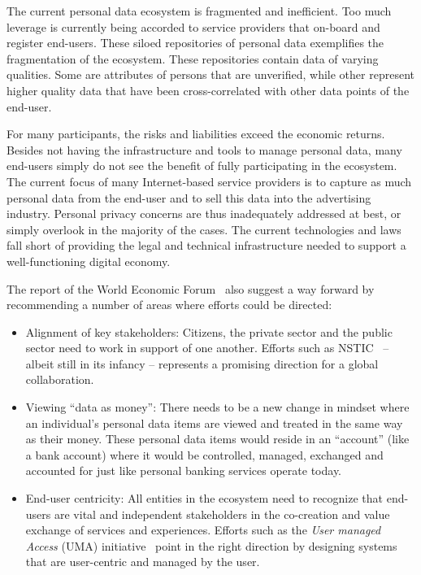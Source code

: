 The current personal data ecosystem is fragmented and inefficient.
Too much leverage is currently being accorded to service providers that on-board
and register end-users.
These siloed repositories of personal data exemplifies the fragmentation of the ecosystem.
These repositories contain data of varying qualities.
Some are attributes of persons that are unverified, while other represent higher quality data that have been cross-correlated with other data points of the end-user.

For many participants, the risks and liabilities exceed the economic returns.
Besides not having the infrastructure and tools to manage personal data, many end-users simply do not see the benefit of fully participating in the ecosystem.
The current focus of many Internet-based service providers is to capture as much personal data from the end-user and to sell this data into the advertising industry.
Personal privacy concerns are thus inadequately addressed at best, or simply overlook in the majority of the cases.
The current technologies and laws fall short of providing the legal and technical infrastructure needed to support a well-functioning digital economy.

The report of the World Economic Forum~\cite{WEF2011} also suggest a way forward by recommending
a number of areas where efforts could be directed:
\begin{itemize}
\item Alignment of key stakeholders:  
Citizens, the private sector and the public sector
need to work in support of one another.
Efforts such as NSTIC~\cite{NSTIC2011} -- albeit still in its infancy --
represents a promising direction
for a global collaboration.


\item Viewing ``data as money'':
There needs to be a new change in mindset where
an individual's personal data items are viewed
and treated in the same way as their money.
These personal data items would reside in an ``account'' (like a bank account)
 where it would be controlled, managed, exchanged and 
accounted for just like personal banking services operate today.


\item End-user centricity:  All entities in the ecosystem need to
recognize that end-users are vital and 
independent stakeholders in the co-creation 
and value exchange of services and experiences.
Efforts such as the {\em User managed Access} (UMA) initiative~\cite{UMAcore}
point in the right direction by designing systems that are
user-centric and managed by the user.


\end{itemize}



